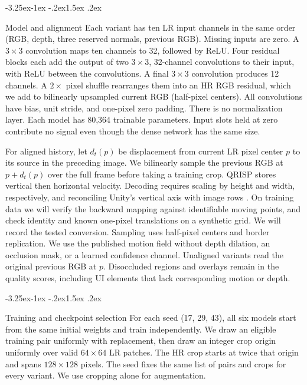 \documentclass[11pt,a4paper]{article}
\makeatletter
\renewcommand\subsection{\@startsection{subsection}{2}{\z@}%
  {-3.25ex\@plus -1ex \@minus -.2ex}{1.5ex \@plus .2ex}%
  {\normalfont\large\bfseries\raggedright}}
\makeatother
\begin{document}
\subsection{Model and alignment}
Each variant has ten LR input channels in the same order (RGB, depth,
three reserved normals, previous RGB). Missing inputs are zero. A
$3\times3$ convolution maps ten channels to 32, followed by ReLU. Four
residual blocks each add the output of two $3\times3$, 32-channel
convolutions to their input, with ReLU between the convolutions. A final
$3\times3$ convolution produces 12 channels. A $2\times$ pixel shuffle
rearranges them into an HR RGB residual, which we add to bilinearly
upsampled current RGB (half-pixel centers). All convolutions have bias,
unit stride, and one-pixel zero padding. There is no normalization layer.
Each model has 80,364 trainable parameters. Input slots held at zero
contribute no signal even though the dense network has the same size.

For aligned history, let $d_t(p)$ be displacement from current LR pixel
center $p$ to its source in the preceding image. We bilinearly sample
the previous RGB at $p+d_t(p)$ over the full frame before taking a
training crop. QRISP stores vertical then horizontal velocity. Decoding
requires scaling by height and width, respectively, and reconciling
Unity's vertical axis with image rows
\cite[Supplement, Annex~A]{mercier2023efficient}.
On training data we will verify the backward mapping against identifiable
moving points, and check identity and known one-pixel translations on a
synthetic grid. We will record the tested conversion. Sampling uses
half-pixel centers and border replication. We use the published motion
field without depth dilation, an occlusion mask, or a learned confidence
channel. Unaligned variants read the original previous RGB at $p$.
Disoccluded regions and overlays remain in the quality scores, including
UI elements that lack corresponding motion or depth.

\subsection{Training and checkpoint selection}
For each seed (17, 29, 43), all six models start from the same initial
weights and train independently. We draw an eligible training pair
uniformly with replacement, then draw an integer crop origin uniformly
over valid $64\times64$ LR patches. The HR crop starts at twice that
origin and spans $128\times128$ pixels. The seed fixes the same list of
pairs and crops for every variant. We use cropping alone for augmentation.
\end{document}
